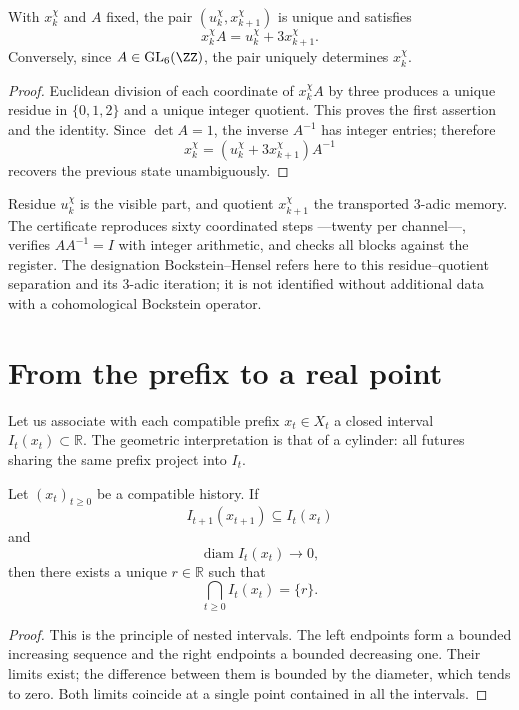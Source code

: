 \begin{proposition}
\label{prop:memoria-bockstein-hensel}
With \(x_k^\chi\) and \(A\) fixed, the pair
\((u_k^\chi,x_{k+1}^\chi)\) is unique and satisfies
\[
x_k^\chi A=u_k^\chi+3x_{k+1}^\chi.
\]
Conversely, since \(A\in\operatorname{GL}_6(\ZZ)\), the pair uniquely determines
\(x_k^\chi\).
\end{proposition}

\begin{proof}
Euclidean division of each coordinate of \(x_k^\chi A\) by three produces
a unique residue in \(\{0,1,2\}\) and a unique integer quotient. This proves
the first assertion and the identity. Since \(\det A=1\), the inverse
\(A^{-1}\) has integer entries; therefore
\[
x_k^\chi=(u_k^\chi+3x_{k+1}^\chi)A^{-1}
\]
recovers the previous state unambiguously.
\end{proof}

Residue \(u_k^\chi\) is the visible part, and quotient
\(x_{k+1}^\chi\) the transported 3-adic memory. The certificate reproduces
sixty coordinated steps ---twenty per channel---, verifies \(AA^{-1}=I\) with
integer arithmetic, and checks all blocks against the register. The designation
Bockstein--Hensel refers here to this residue--quotient separation and its
3-adic iteration; it is not identified without additional data with a
cohomological Bockstein operator.

\section{From the prefix to a real point}

Let us associate with each compatible prefix \(x_t\in X_t\) a closed interval
\(I_t(x_t)\subset\mathbb R\). The geometric interpretation is that of a
cylinder: all futures sharing the same prefix project into
\(I_t\).

\begin{theorem}
Let \((x_t)_{t\ge0}\) be a compatible history. If
\[
I_{t+1}(x_{t+1})\subseteq I_t(x_t)
\]
and
\[
\operatorname{diam} I_t(x_t)\longrightarrow0,
\]
then there exists a unique \(r\in\mathbb R\) such that
\[
\bigcap_{t\ge0}I_t(x_t)=\{r\}.
\]
\end{theorem}

\begin{proof}
This is the principle of nested intervals. The left endpoints form a
bounded increasing sequence and the right endpoints a bounded decreasing one. Their limits
exist; the difference between them is bounded by the diameter, which tends to
zero. Both limits coincide at a single point contained in all the
intervals.
\end{proof}

